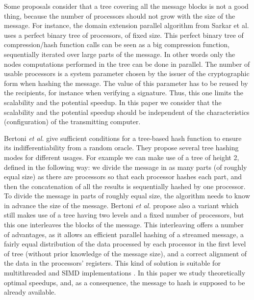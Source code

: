 \documentclass{llncs}
\begin{document}
Some proposals \cite{SS01,SS02,PS03} consider that a tree covering all the message blocks
is not a good thing, because the number of processors should not grow with the size of the message.
For instance, the domain extension parallel algorithm from Sarkar et al. \cite{SS01,SS02,PS03} uses a perfect binary tree
of processors, of fixed size. 
This perfect binary tree of compression/hash function calls can be seen as a big compression function, sequentially iterated
over large parts of the message. 
In other words only the nodes computations performed in the tree can be done in parallel.
The number of usable processors is a system parameter chosen by the issuer of the cryptographic form when hashing the message.
The value of this parameter has to be reused by the recipients, for instance when verifying a signature. 
Thus, this one limits the scalability and the potential speedup. 
In this paper we consider that the scalability and the potential speedup 
should be independent of the characteristics (configuration) of the transmitting computer.



Bertoni \textit{et al.} \cite{BDPV09,BDPV14_Sak} give sufficient conditions for a tree-based hash function to ensure its indifferentiability
from a random oracle. They propose several tree hashing modes for different usages.
For example we can make use of a tree of height 2, defined in the following way: we divide the message in as many parts (of roughly equal size) 
as there are processors so that each processor hashes each part, 
and then the concatenation of all the results is sequentially hashed by one processor. 
To divide the message in parts of roughly equal size, the algorithm needs to know in advance the size of the message.
Bertoni \textit{et al.} propose also a variant
which still makes use of a tree having two levels and a fixed number of processors, but this one interleaves 
the blocks of the message. This interleaving offers a number of advantages, as it allows an efficient parallel hashing of a streamed message, 
a fairly equal distribution of the data processed by each processor in the first level of tree (without prior knowledge of the message size), 
and a correct alignment of the data in the processors' registers. This kind of solution is suitable for multithreaded and SIMD implementations \cite{Gue14}.
In this paper we study theoretically optimal speedups, and, 
as a consequence, the message to hash is supposed to be already available.
\end{document}
